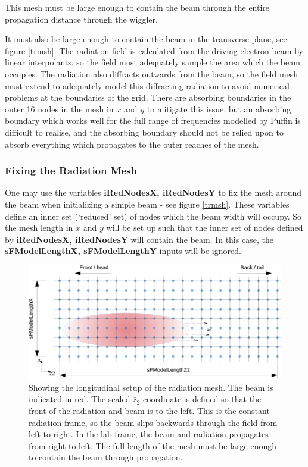 \documentclass[12pt]{article}%
\begin{document}
This mesh must be large enough to contain the beam through the entire propagation distance through the wiggler.

It must also be large enough to contain the beam in the transverse plane, see figure \ref{trmsh}. The radiation field is calculated from the driving electron beam by linear interpolants, so the field must adequately sample the area which the beam occupies.  The radiation also diffracts outwards from the beam, so the field mesh must extend to adequately model this diffracting radiation to avoid numerical problems at the boundaries of the grid. There are absorbing boundaries in the outer 16 nodes in the mesh in $x$ and $y$ to mitigate this issue, but an absorbing boundary which works well for the full range of frequencies modelled by Puffin is difficult to realise, and the absorbing boundary should not be relied upon to absorb everything which propagates to the outer reaches of the mesh.

\subsubsection{Fixing the Radiation Mesh}

One may use the variables {\bf iRedNodesX, iRedNodesY} to fix the mesh around the beam when initializing a simple beam - see figure \ref{trmsh}. These variables define an inner set (`reduced' set) of nodes which the beam width will occupy. So the mesh length in $x$ and $y$ will be set up such that the inner set of nodes defined by  {\bf iRedNodesX, iRedNodesY} will contain the beam. In this case, the {\bf sFModelLengthX, sFModelLengthY} inputs will be ignored.


\begin{figure}
\centering
\includegraphics[width=150mm]{long_mesh.png}
\caption{Showing the longitudinal setup of the radiation mesh. The beam is indicated in red. The scaled $\bar{z}_2$ coordinate is defined so that the front of the radiation and beam is to the left. This is the constant radiation frame, so the beam slips backwards through the field from left to right. In the lab frame, the beam and radiation propagates from right to left. The full length of the mesh must be large enough to contain the beam through propagation.}
\label{lgmsh}
\end{figure}
\end{document}
